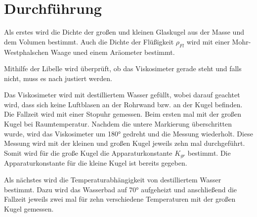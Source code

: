 \section{Durchführung}
\label{sec:Durchführung}

Als erstes wird die Dichte der großen und kleinen Glaskugel aus der Masse und dem Volumen bestimmt. 
Auch die Dichte der Flüßigkeit $\rho_{Fl}$ wird mit einer Mohr-Westphalschen Waage uned einem Aräometer bestimmt. 

Mithilfe der Libelle wird überprüft, ob das Viskosimeter gerade steht und falls nicht, muss es nach justiert werden. 

Das Viskosimeter wird mit destilliertem Wasser gefüllt, wobei darauf geachtet wird, 
dass sich keine Luftblasen an der Rohrwand bzw. an der Kugel befinden. 
Die Fallzeit wird mit einer Stopuhr gemessen. Beim ersten mal mit der großen Kugel bei Raumtemperatur. 
Nachdem die untere Markierung überschritten wurde, 
wird das Viskosimeter um 180° gedreht und die Messung wiederholt. 
Diese Messung wird mit der kleinen und großen Kugel jeweils zehn mal durchgeführt. 
Somit wird für die große Kugel die Apparaturkonstante $K_{gr}$ bestimmt. 
Die Apparaturkonstante für die kleine Kugel ist bereits gegeben. 

Als nächstes wird die Temperaturabhängigkeit von destilliertem Wasser bestimmt. 
Dazu wird das Wasserbad auf 70° aufgeheizt und anschließend die Fallzeit jeweils zwei mal 
für zehn verschiedene Temperaturen mit der großen Kugel gemessen. 
